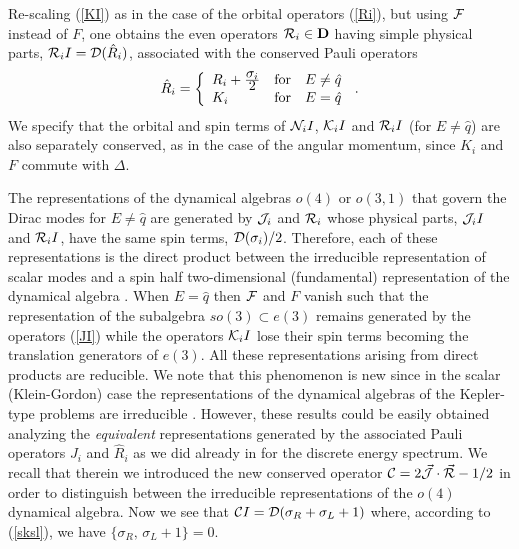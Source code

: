 \documentclass[a4paper,12pt]{article}
\begin{document}
Re-scaling (\ref{KI}) as in the case of the orbital operators (\ref{Ri}), 
but using ${\cal F}$ instead of $F$, one obtains the even operators 
${\cal R}_{i}\in {\bf D}$ \cite{CV4} having simple physical parts, 
${\cal R}_{i}I={\cal D}(\hat R_i)$, associated with the conserved 
Pauli operators 
\begin{equation}
\hat R_{i}=\left\{
\begin{array}{lcl}
R_{i}+\frac{\textstyle \sigma_i}{\textstyle2}&{\rm for}&E \not=\hat q\\ 
K_{i}&{\rm for}&E =\hat q 
\end{array}\right. \,.
\end{equation}
We specify that the orbital and  spin terms of 
${\cal N}_{i}I$, ${\cal K}_i I$ 
and ${\cal R}_{i}I$ (for $E\not =\hat q$) are also separately conserved, 
as in the case of the angular momentum, since $K_i$ and $F$ commute with 
$\Delta$. 


The representations of the dynamical algebras $o(4)$ or $o(3,1)$ that 
govern the Dirac modes for $E\not=\hat q$ are generated by ${\cal J}_{i}$ 
and ${\cal R}_{i}$ \cite{CV4} whose physical parts, ${\cal J}_{i}I$ and 
${\cal R}_{i}I$, have the same spin terms, ${\cal D}(\sigma_{i})/2$. 
Therefore,  each of these representations is the direct product between 
the irreducible representation of scalar modes and a spin half 
two-dimensional (fundamental) representation of the dynamical algebra 
\cite{CV4}. When $E=\hat q$ then ${\cal F}$ and $F$ vanish  such that 
the representation of the subalgebra $so(3)\subset e(3)$ remains 
generated by the operators (\ref{JI}) while the operators  
${\cal K}_{i}I$ lose their spin terms becoming the translation 
generators of $e(3)$. All these representations arising from direct 
products are reducible. We note that this phenomenon is new since in 
the scalar (Klein-Gordon) case the representations of the dynamical 
algebras of the Kepler-type problems are irreducible \cite{GRFH}.  
However, these results could be easily obtained analyzing the 
{\em equivalent} representations generated by the associated Pauli 
operators $J_{i}$ and $\hat R_{i}$  as we did already in \cite{CV4} for 
the discrete energy spectrum.   We recall that therein we introduced 
the new conserved operator ${\cal C}=2\vec{\cal J}\cdot\vec{\cal R}-1/2$  
in order to distinguish between the irreducible representations of the 
$o(4)$ dynamical algebra. Now we see that 
${\cal C}I={\cal D}(\sigma_{R}+\sigma_{L}+1)$ where, according to 
(\ref{sksl}), we have $\{\sigma_{R},\,\sigma_{L}+1\}=0$. 
\end{document}
